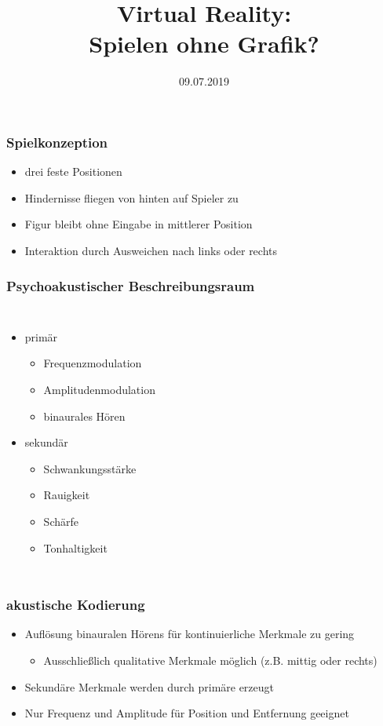 \documentclass{beamer}
\title{Virtual Reality:\\Spielen ohne Grafik?}
\date{09.07.2019}
\begin{document}
\begin{frame}
\titlepage
\end{frame}

\begin{frame}
\frametitle{Spielkonzeption}

\begin{adjustbox}{max totalsize={.9\textwidth}{.7\textheight}, center}

\end{adjustbox}

\begin{itemize}
	\item drei feste Positionen
	\item Hindernisse fliegen von hinten auf Spieler zu
	\item Figur bleibt ohne Eingabe in mittlerer Position
	\item Interaktion durch Ausweichen nach links oder rechts
\end{itemize}

\end{frame}

\begin{frame}
\frametitle{Psychoakustischer Beschreibungsraum}

\begin{columns}
	\begin{itemize}
		\item primär
		\begin{itemize}
			\item Frequenzmodulation
			\item Amplitudenmodulation
			\item binaurales Hören
		\end{itemize}

		\item sekundär
		\begin{itemize}
			\item Schwankungsstärke
			\item Rauigkeit
			\item Schärfe
			\item Tonhaltigkeit
		\end{itemize}
	\end{itemize}
	
\end{columns}
\end{frame}

\begin{frame}
\frametitle{akustische Kodierung}
\begin{itemize}
	\item Auflösung binauralen Hörens für kontinuierliche Merkmale zu gering
	\begin{itemize}
		\item Ausschließlich qualitative Merkmale möglich (z.B. mittig oder rechts)
	\end{itemize}
	\item Sekundäre Merkmale werden durch primäre erzeugt
	\item Nur Frequenz und Amplitude für Position und Entfernung geeignet
\end{itemize}
\end{frame}
\end{document}
